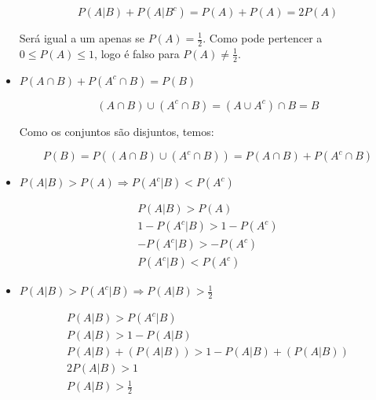 \begin{itemize}
  \[P\left( {A|B} \right) + P\left( {A|{B^c}} \right) = P\left( A \right) + P\left( A \right) = 2P\left( A \right)\]

  Será igual a um apenas se $\displaystyle P(A) = \frac{1}{2}$. Como pode pertencer
  a $0 \le P\left( A \right) \le 1$, logo é falso para $\displaystyle P(A) \ne \frac{1}{2}$.

  \item $P\left( {A \cap B} \right) + P\left( {{A^c} \cap B} \right) = P\left( B \right)$

  \[\left( {A \cap B} \right) \cup \left( {{A^c} \cap B} \right) = \left( {A \cup {A^c}} \right) \cap B = B\]

  Como os conjuntos são disjuntos, temos:

  \[P\left( B \right) = P\left( {\left( {A \cap B} \right) \cup \left( {{A^c} \cap B} \right)} \right) = P\left( {A \cap B} \right) + P\left( {{A^c} \cap B} \right)\]

  \item $P\left( {A|B} \right) > P\left( A \right) \Rightarrow P\left( {{A^c}|B} \right) < P\left( {{A^c}} \right)$

  \[\begin{array}{l}
  P\left( {A|B} \right) > P\left( A \right)\\
  1 - P\left( {{A^c}|B} \right) > 1 - P\left( {{A^c}} \right)\\
   - P\left( {{A^c}|B} \right) >  - P\left( {{A^c}} \right)\\
  P\left( {{A^c}|B} \right) < P\left( {{A^c}} \right)
  \end{array}\]

  \item $\displaystyle P\left( {A|B} \right) > P\left( {{A^c}|B} \right) \Rightarrow P\left( {A|B} \right) > \frac{1}{2}$

  \[\begin{array}{l}
  \displaystyle
  P\left( {A|B} \right) > P\left( {{A^c}|B} \right)\\
  P\left( {A|B} \right) > 1 - P\left( {A|B} \right)\\
  P\left( {A|B} \right) + \left( {P\left( {A|B} \right)} \right) > 1 - P\left( {A|B} \right) + \left( {P\left( {A|B} \right)} \right)\\
  2P\left( {A|B} \right) > 1\\
  P\left( {A|B} \right) > \frac{1}{2}
  \end{array}\]

\end{itemize}
